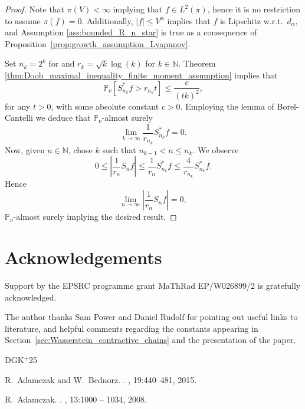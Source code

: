 \documentclass[12pt]{article}
\theoremstyle{plain}
\newcommand{\N}{\mathbb{N}}
\begin{document}
{\begin{proof}
Note that $\pi(V) < \infty$ implying that $f \in L^2(\pi)$, hence it is no restriction to assume $\pi(f)=0$. 
Additionally, $\vert f \vert \le V^\alpha$ implies that $f$ is Lipschitz w.r.t.~$d_\alpha$, and Assumption \ref{ass:bounded_R_n_star} is true as a consequence of Proposition~\ref{prop:growth_assumption_Lyapunov}.  



Set $n_k = 2^k$ for and $r_k = \sqrt{k}\log (k)$ for $k \in \N$. Theorem \ref{thm:Doob_maximal_inequality_finite_moment_assumption} implies that 
\[
\mathbb{P}_\nu\left[ S_{n_k}^*f > r_{n_k} t \right] \leq \frac{c}{(tk)^2},
\]
for any $t >0$, with some absolute constant $c>0$.
Employing the lemma of Borel-Cantelli we deduce that $\mathbb{P}_\nu$-almost surely
\[
\lim_{k \to \infty}
\frac{1}{r_{n_k}}S_{n_k}^* f  =0.
\] 
Now, given $n \in\N$, chose $k$ such that $n_{k-1} < n \leq n_k$. 
We observe 
\[
0 \leq \left\vert \frac{1}{r_n} S_n f \right\vert \leq \frac{1}{r_n} S_{n_k}^* f \leq \frac{4}{r_{n_k}} S_{n_k}^*f.
\]
Hence
\[
\lim_{n \to \infty} \left\vert \frac{1}{r_n} S_n f \right\vert =0,
\]
$\mathbb{P}_\nu$-almost surely implying the desired result. 
\end{proof}




\section*{Acknowledgements}
Support by the EPSRC programme grant MaThRad EP/W026899/2 is gratefully acknowledged. 

The author thanks Sam Power and Daniel Rudolf for pointing out useful links to literature, and helpful comments regarding the constants appearing in Section~\ref{sec:Wasserstein_contractive_chains} and the presentation of the paper.


\newcommand{\etalchar}[1]{$^{#1}$}
\begin{thebibliography}{DGK{\etalchar{+}}25}
	
	R.~Adamczak and W.~Bednorz.
	.
	, 19:440--481, 2015.
	
	R.~Adamczak.
	.
	, 13:1000 -- 1034, 2008.
	

\end{thebibliography}}
\end{document}
